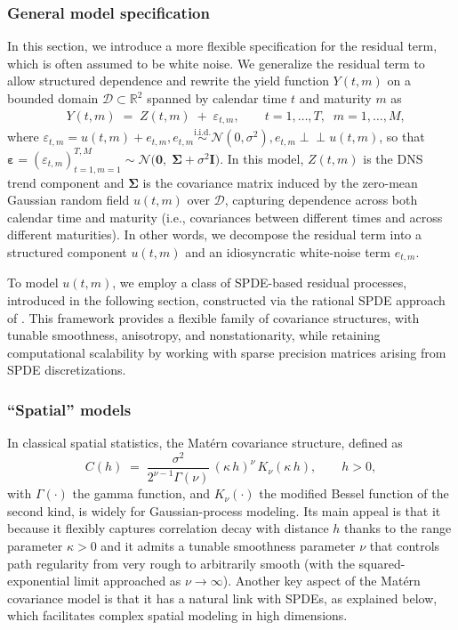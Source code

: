 \documentclass[
  12pt]{article}
\begin{document}
\subsubsection{General model specification}
In this section, we introduce a more flexible specification for the residual term, which is often assumed to be white noise. We generalize the residual term to allow structured dependence and rewrite the yield function $Y(t,m)$ on a bounded domain $\mathcal{D}\subset\mathbb{R}^2$ spanned by calendar time $t$ and maturity $m$ as
\begin{align}
    &Y(t,m) \;=\; Z(t,m) \;+\; \varepsilon_{t,m}, \qquad t = 1,\ldots,T,\;\; m = 1,\ldots,M,
    \label{obsmodel}
\end{align}
where $ \varepsilon_{t,m} = u(t,m) + e_{t,m}, e_{t,m}\stackrel{\text{i.i.d.}}{\sim}\mathcal{N}(0,\sigma^2), e_{t,m} \perp\!\!\!\perp u(t,m)$, so that $\boldsymbol{\varepsilon}=(\varepsilon_{t,m})_{t=1,m=1}^{T,M}\sim \mathcal{N}\!\big(\boldsymbol{0},\;\boldsymbol{\Sigma} + \sigma^2 \boldsymbol{I}\big)$. In this model, $Z(t,m)$ is the DNS trend component and $\boldsymbol{\Sigma}$ is the covariance matrix induced by the zero-mean Gaussian random field $u(t,m)$ over $\mathcal{D}$, capturing dependence across both calendar time and maturity (i.e., covariances between different times and across different maturities). In other words, we decompose the residual term into a structured component $u(t,m)$ and an idiosyncratic white-noise term $e_{t,m}$.

To model $u(t,m)$, we employ a class of SPDE-based residual processes, introduced in the following section, constructed via the rational SPDE approach of \cite{bolin2020rational}. This framework provides a flexible family of covariance structures, with tunable smoothness, anisotropy, and nonstationarity, while retaining computational scalability by working with sparse precision matrices arising from SPDE discretizations.

\subsubsection{``Spatial'' models}
In classical spatial statistics, the Matérn covariance structure, defined as
\[
C(h) \;=\; \frac{\sigma^2}{2^{\nu-1}\Gamma(\nu)}\,(\kappa\,h)^\nu\,K_\nu(\kappa\,h), \qquad h > 0,
\]
with $\Gamma(\cdot)$ the gamma function, and $K_\nu(\cdot)$ the modified Bessel function of the second kind, is widely for Gaussian-process modeling. Its main appeal is that it because it flexibly captures correlation decay with distance $h$ thanks to the range parameter $\kappa > 0$ and it admits a tunable smoothness parameter $\nu$ that controls path regularity from very rough to arbitrarily smooth (with the squared-exponential limit approached as $\nu\to\infty$). Another key aspect of the Mat\'ern covariance model is that it has a natural link with SPDEs, as explained below, which facilitates complex spatial modeling in high dimensions.
\end{document}
